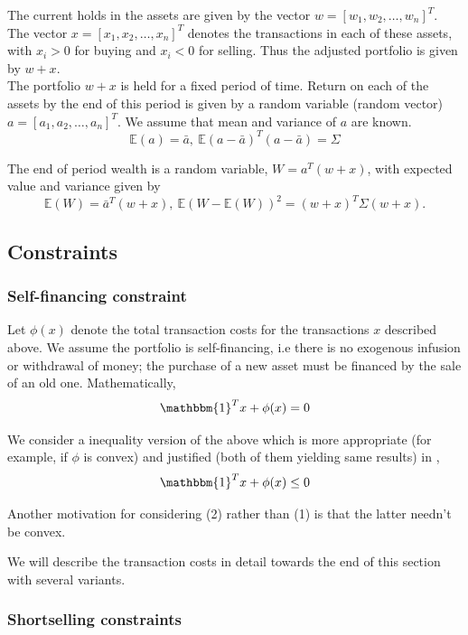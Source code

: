 \documentclass[a4paper]{article}
\begin{document}
The current holds in the assets are given by the vector $w= [w_1,w_2,\ldots, w_n]^T$. The vector $x=[x_1,x_2,\ldots, x_n]^T$  denotes the transactions in each of these assets, with $x_i>0$ for buying and $x_i<0$ for selling. Thus the adjusted portfolio is given by $w+x$. \\

The portfolio $w+x$ is held for a fixed period of time. Return on each of the assets by the end of this period is given by a random variable (random vector) $a=[a_1,a_2,\ldots, a_n]^T$. We assume that mean and variance of $a$ are known.
$$
\mathbb{E}(a)= \bar{a},\ \mathbb{E} (a-\bar{a})^T (a-\bar{a}) =\Sigma
$$

The end of period wealth is a random variable, $W = a^T(w + x)$, with expected value and
variance given by
$$
\mathbb{E}(W) = \bar{a}^T(w+x), \ \mathbb{E}(W-\mathbb{E}(W))^2= (w+x)^T \Sigma (w+x).
$$

\subsection{Constraints}
\subsubsection{Self-financing constraint}

Let $\phi(x)$ denote the total transaction costs for the transactions $x$ described above. We assume the portfolio is self-financing, i.e there is no exogenous infusion or withdrawal of money; the purchase of a new asset must be financed by the sale of an old one.\cite{1} Mathematically,
$$
\mathbbm{1}^Tx + \phi(x) =0
$$

We consider a inequality version of the above which is more appropriate (for example, if $\phi$ is convex) and justified (both of them yielding same results) in \cite{2},
\begin{equation}
\mathbbm{1}^Tx + \phi(x)  \leq 0 
\end{equation}

Another motivation for considering (2) rather than (1) is that the latter needn't be convex.


We will describe the transaction costs in detail towards the end of this section with several variants.

\subsubsection{Shortselling constraints}
\end{document}

